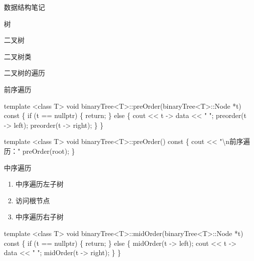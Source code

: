 \documentclass[
  ignorenonframetext,
]{beamer}
\newenvironment{Shaded}{}{}
\newcommand{\NormalTok}[1]{#1}
\providecommand{\tightlist}{%
  \setlength{\itemsep}{0pt}\setlength{\parskip}{0pt}}
\begin{document}
\begin{frame}[fragile]{数据结构笔记}
\begin{block}{树}
\begin{block}{二叉树}
\begin{block}{二叉树类}
\begin{block}{二叉树的遍历}
\begin{block}{前序遍历}
\begin{Shaded}
\begin{Highlighting}[]
\NormalTok{template \textless{}class T\textgreater{}}
\NormalTok{void binaryTree\textless{}T\textgreater{}::preOrder(binaryTree\textless{}T\textgreater{}::Node *t) const}
\NormalTok{\{}
\NormalTok{  if (t == nullptr)}
\NormalTok{  \{}
\NormalTok{    return;}
\NormalTok{  \}}
\NormalTok{  else }
\NormalTok{  \{}
\NormalTok{    cout \textless{}\textless{} t {-}\textgreater{} data \textless{}\textless{} " ";}
\NormalTok{    preorder(t {-}\textgreater{} left);}
\NormalTok{    preorder(t {-}\textgreater{} right);}
\NormalTok{  \}}
\NormalTok{\}}
\end{Highlighting}
\end{Shaded}

\begin{Shaded}
\begin{Highlighting}[]
\NormalTok{template \textless{}class T\textgreater{}}
\NormalTok{void binaryTree\textless{}T\textgreater{}::preOrder() const}
\NormalTok{\{}
\NormalTok{  cout \textless{}\textless{} "\textbackslash{}n前序遍历："}
\NormalTok{  preOrder(root);}
\NormalTok{\}}
\end{Highlighting}
\end{Shaded}
\end{block}

\begin{block}{中序遍历}
\protect{}\label{ux4e2dux5e8fux904dux5386-1}
\begin{enumerate}
\tightlist
\item
  中序遍历左子树
\item
  访问根节点
\item
  中序遍历右子树
\end{enumerate}

\begin{Shaded}
\begin{Highlighting}[]
\NormalTok{template \textless{}class T\textgreater{}}
\NormalTok{void binaryTree\textless{}T\textgreater{}::midOrder(binaryTree\textless{}T\textgreater{}::Node *t) const}
\NormalTok{\{}
\NormalTok{  if (t == nullptr)}
\NormalTok{  \{}
\NormalTok{    return;}
\NormalTok{  \}}
\NormalTok{  else}
\NormalTok{  \{}
\NormalTok{    midOrder(t {-}\textgreater{} left);}
\NormalTok{    cout \textless{}\textless{} t {-}\textgreater{} data \textless{}\textless{} " ";}
\NormalTok{    midOrder(t {-}\textgreater{} right);}
\NormalTok{  \}}
\NormalTok{\}}
\end{Highlighting}
\end{Shaded}


\end{block}
\end{block}
\end{block}
\end{block}
\end{block}
\end{frame}
\end{document}
